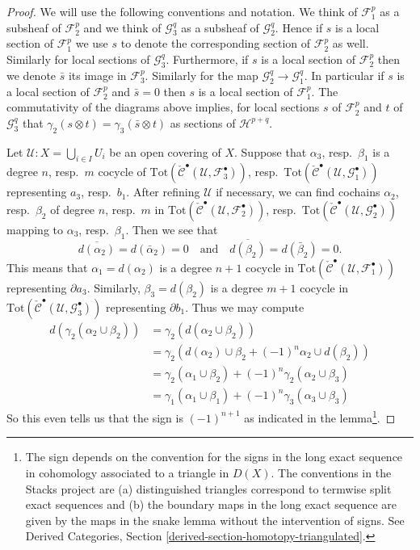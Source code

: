 \documentclass[10pt,a4paper]{amsart}
\theoremstyle{plain}
\theoremstyle{definition}
\theoremstyle{remark}
\numberwithin{equation}{subsection}
\begin{document}
\begin{proof}
We will use the following conventions and notation. We think of
${\mathcal F}_1^p$ as a subsheaf of ${\mathcal F}_2^p$ and we think of
${\mathcal G}_3^q$ as a subsheaf of ${\mathcal G}_2^q$. Hence if $s$ is
a local section of ${\mathcal F}_1^p$ we use $s$ to denote
the corresponding section of ${\mathcal F}_2^p$ as well. Similarly
for local sections of ${\mathcal G}_3^q$. Furthermore,
if $s$ is a local section of ${\mathcal F}_2^p$ then we denote
$\bar s$ its image in ${\mathcal F}_3^p$. Similarly for the
map ${\mathcal G}_2^q \to {\mathcal G}^q_1$. In particular if
$s$ is a local section of ${\mathcal F}_2^p$ and $\bar s = 0$
then $s$ is a local section of ${\mathcal F}_1^p$. The commutativity
of the diagrams above implies, for local sections $s$ of
${\mathcal F}_2^p$ and $t$ of ${\mathcal G}_3^q$ that
$\gamma_2(s \otimes t) = \gamma_3(\bar s \otimes t)$ as sections of
${\mathcal H}^{p + q}$.

\medskip\noindent
Let ${\mathcal U} : X =  \bigcup_{i \in I} U_i$
be an open covering of $X$. Suppose that $\alpha_3$,
resp.\ $\beta_1$ is a degree $n$, resp.\ $m$ cocycle of
$\text{Tot}(
\check{\mathcal{C}}^\bullet({\mathcal U}, {\mathcal F}_3^\bullet))$,
resp.\ $\text{Tot}(
\check{\mathcal{C}}^\bullet({\mathcal U}, {\mathcal G}_1^\bullet))$
representing $a_3$, resp.\ $b_1$. After refining $\mathcal{U}$ if necessary,
we can find cochains $\alpha_2$, resp.\ $\beta_2$ of
degree $n$, resp.\ $m$ in
$\text{Tot}(
\check{\mathcal{C}}^\bullet({\mathcal U}, {\mathcal F}_2^\bullet))$,
resp.\ $\text{Tot}(
\check{\mathcal{C}}^\bullet({\mathcal U}, {\mathcal G}_2^\bullet))$
mapping to $\alpha_3$, resp.\ $\beta_1$.
Then we see that
$$
\overline{d(\alpha_2)} = d(\bar \alpha_2) = 0
\quad\text{and}\quad
\overline{d(\beta_2)} = d(\bar \beta_2) = 0.
$$
This means that $\alpha_1 = d(\alpha_2)$ is a degree $n + 1$ cocycle in
$\text{Tot}(\check{\mathcal{C}}^\bullet({\mathcal U}, {\mathcal F}_1^\bullet))$
representing $\partial a_3$. Similarly, $\beta_3 = d(\beta_2)$ is
a degree $m + 1$ cocycle in
$\text{Tot}(\check{\mathcal{C}}^\bullet({\mathcal U}, {\mathcal G}_3^\bullet))$
representing $\partial b_1$.
Thus we may compute
\begin{align*}
d(\gamma_2(\alpha_2 \cup \beta_2))
& =
\gamma_2(d(\alpha_2 \cup \beta_2))
\\
& =
\gamma_2(d(\alpha_2) \cup \beta_2 + (-1)^n \alpha_2 \cup d(\beta_2) )
\\
& =
\gamma_2( \alpha_1 \cup \beta_2)  + (-1)^n \gamma_2( \alpha_2 \cup \beta_3)
\\
& =
\gamma_1(\alpha_1 \cup \beta_1) + (-1)^n \gamma_3(\alpha_3 \cup \beta_3)
\end{align*}
So this even tells us that the sign is $(-1)^{n + 1}$ as indicated
in the lemma\footnote{The sign depends on the convention for the
signs in the long exact sequence in cohomology associated to a triangle
in $D(X)$. The conventions in the Stacks project are (a) distinguished
triangles correspond to termwise split exact sequences and (b) the boundary
maps in the long exact sequence are given by the maps in the snake lemma
without the intervention of signs. See
Derived Categories, Section \ref{derived-section-homotopy-triangulated}.}.
\end{proof}
\end{document}
